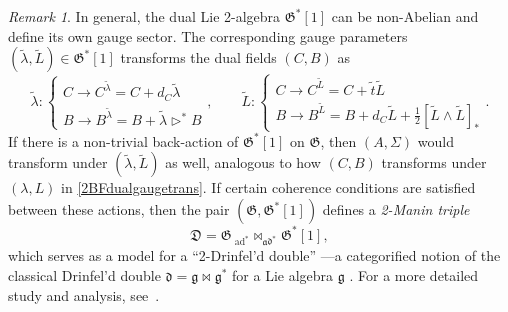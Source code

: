 \documentclass[onecolumn]{article}
\theoremstyle{theorem}
\theoremstyle{remark}
\newtheorem{remark}{Remark}[section]
\theoremstyle{example}
\theoremstyle{definition}
\numberwithin{equation}{section}
\begin{document}
\begin{remark}\label{2ddsymm}
In general, the dual Lie 2-algebra $\mathfrak{G}^*[1]$ can be non-Abelian and define its own gauge sector. The corresponding gauge parameters $(\tilde\lambda,\tilde L)\in\mathfrak{G}^*[1]$ transforms the dual fields $(C,B)$ as
\begin{equation}
    \tilde\lambda: \begin{cases}C\rightarrow C^{\tilde\lambda} = C + d_C\tilde\lambda \\ B\rightarrow B^{\tilde\lambda} = B + \tilde\lambda \rhd^* B\end{cases},\qquad \tilde L:\begin{cases}C\rightarrow C^{\tilde L} = C + \tilde t \tilde L \\ B\rightarrow B^{\tilde L} = B + d_C\tilde L + \frac{1}{2}[\tilde L\wedge \tilde L]_*\end{cases}.\nonumber
\end{equation}
{If} there is a non-trivial back-action of $\mathfrak{G}^*[1]$ on $\mathfrak{G}$, then $(A,\Sigma)$ would transform under $(\tilde\lambda,\tilde L)$ as well, analogous to how $(C,B)$ transforms under $(\lambda,L)$ in  \eqref{2BFdualgaugetrans}. If certain coherence conditions are satisfied between these actions, then the pair $(\mathfrak{G},\mathfrak{G}^*[1])$  defines a {\it 2-Manin triple}
\begin{equation}
    \mathfrak{D} = \mathfrak{G}~_{\operatorname{ad}^*}\bowtie_{\mathfrak{ad}^*}\mathfrak{G}^*[1],\nonumber
\end{equation}
which serves as a model for a ``2-Drinfel'd double''  \cite{Bai_2013,chen:2022}---a categorified notion of the classical Drinfel'd double $\mathfrak{d} = \mathfrak{g}\bowtie \mathfrak{g}^*$ for a Lie algebra $\mathfrak{g}$ \cite{Semenov1992}. For a more detailed study and analysis, see~\cite{chen:2022}.
\end{remark}
\end{document}
